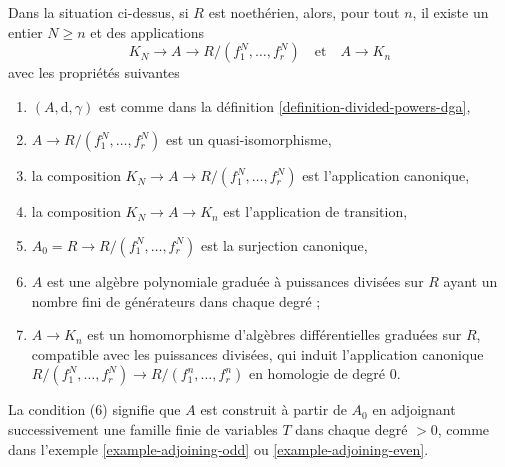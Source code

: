 \begin{lemma}

\label{lemma-lift-tate-to-koszul}

Dans la situation ci-dessus, si $R$ est noethérien, alors, pour tout $n$, il existe un entier $N \geq n$ et des applications
$$
K_N \to A \to R/(f_1^N, \ldots, f_r^N)\quad\text{et}\quad A \to K_n
$$
avec les propriétés suivantes

\begin{enumerate}

\item  $(A, \text{d}, \gamma)$ est comme dans la définition \ref{definition-divided-powers-dga},
\item  $A \to R/(f_1^N, \ldots, f_r^N)$ est un quasi-isomorphisme,
\item la composition $K_N \to A \to R/(f_1^N, \ldots, f_r^N)$
est l'application canonique,
\item la composition $K_N \to A \to K_n$ est l'application de transition,
\item  $A_0 = R \to R/(f_1^N, \ldots, f_r^N)$ est la surjection canonique,
\item  $A$ est une algèbre polynomiale graduée à puissances divisées sur $R$
ayant un nombre fini de générateurs dans chaque degré ;
\item  $A \to K_n$ est un homomorphisme d'algèbres différentielles graduées sur $R$, compatible avec les puissances divisées, qui induit l'application canonique
$R/(f_1^N, \ldots, f_r^N) \to R/(f_1^n, \ldots, f_r^n)$ en homologie de degré $0$.

\end{enumerate}

La condition (6) signifie que $A$ est construit à partir de $A_0$ en adjoignant successivement une famille finie de variables $T$ dans chaque degré
$> 0$, comme dans l'exemple \ref{example-adjoining-odd} ou \ref{example-adjoining-even}.

\end{lemma}

